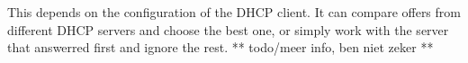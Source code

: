 This depends on the configuration of the DHCP client. It can compare offers from different DHCP servers and choose the best one, or simply work with the server that answerred first and ignore the rest.
** todo/meer info, ben niet zeker **

